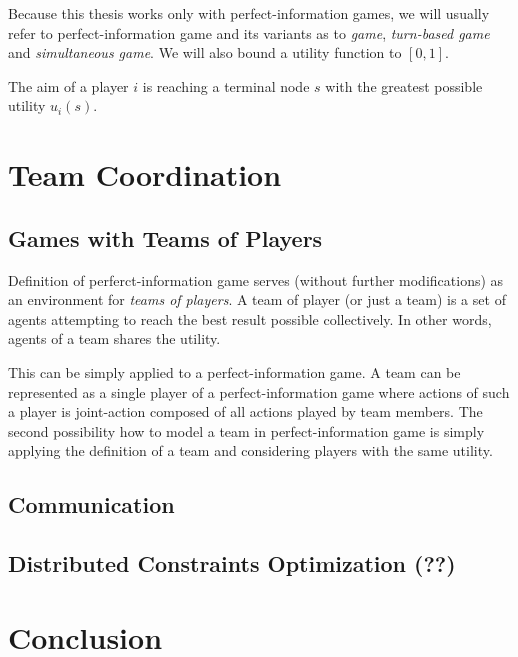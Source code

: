 Because this thesis works only with perfect-information games, we will usually refer to
perfect-information game and its variants as to \emph{game}, \emph{turn-based game} and
\emph{simultaneous game}. We will also bound a utility function to $[0,1]$.

The aim of a player $i$ is reaching a terminal node $s$ with the greatest possible utility
$u_i(s)$.


\section{Team Coordination}

\subsection{Games with Teams of Players}

Definition of perferct-information game serves (without further modifications) as an
environment for \emph{teams of players}. A team of player (or just a team) is a set of agents
attempting to reach the best result possible collectively. In other words, agents of a team
shares the utility. 

This can be simply applied to a perfect-information game. A team can be represented as a single
player of a perfect-information game where actions of such a player is joint-action composed of
all actions played by team members. The second possibility how to model a team in
perfect-information game is simply applying the definition of a team and considering players
with the same utility.



\subsection{Communication}
\subsection{Distributed Constraints Optimization (??)}

\section{Conclusion}
